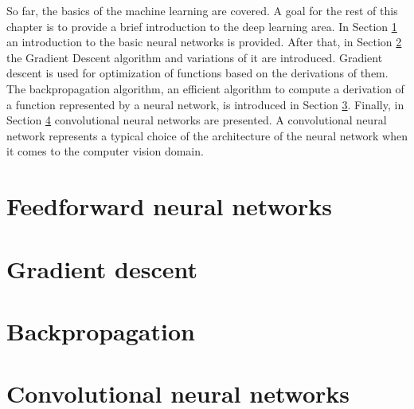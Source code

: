 So far, the basics of the machine learning are covered. A goal for the rest of this chapter is to provide a brief introduction to the deep learning area. In Section \ref{subsection:FNN} an introduction to the basic neural networks is provided. After that, in Section \ref{subsection:gradient-descent} the Gradient Descent algorithm and variations of it are introduced. Gradient descent is used for optimization of functions based on the derivations of them. The backpropagation algorithm, an efficient algorithm to compute a derivation of a function represented by a neural network, is introduced in Section \ref{subsection:backpropagation}. Finally, in Section \ref{subsection:convolutionalNN} convolutional neural networks are presented. A convolutional neural network represents a typical choice of the architecture of the neural network when it comes to the computer vision domain.

\section{Feedforward neural networks}
\label{subsection:FNN}


\section{Gradient descent}
\label{subsection:gradient-descent}


\section{Backpropagation}
\label{subsection:backpropagation}


\section{Convolutional neural networks}
\label{subsection:convolutionalNN}

